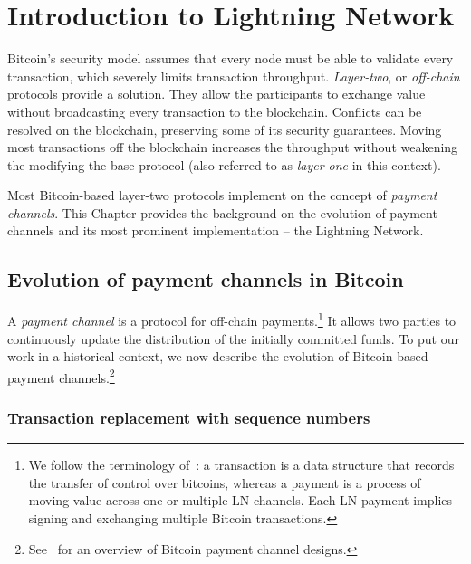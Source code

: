 \chapter{Introduction to Lightning Network}

\label{Chapter05IntroLightning}

Bitcoin's security model assumes that every node must be able to validate every transaction, which severely limits transaction throughput.
\textit{Layer-two}, or \textit{off-chain} protocols provide a solution.
They allow the participants to exchange value without broadcasting every transaction to the blockchain.
Conflicts can be resolved on the blockchain, preserving some of its security guarantees.
Moving most transactions off the blockchain increases the throughput without weakening the modifying the base protocol (also referred to as \textit{layer-one} in this context).

Most Bitcoin-based layer-two protocols implement on the concept of \textit{payment channels}.
This Chapter provides the background on the evolution of payment channels and its most prominent implementation -- the Lightning Network.


\section{Evolution of payment channels in Bitcoin}

A \textit{payment channel} is a protocol for off-chain payments.\footnote{We follow the terminology of~\cite{Antonopoulos2020}: a transaction is a data structure that records the transfer of control over bitcoins, whereas a payment is a process of moving value across one or multiple LN channels. Each LN payment implies signing and exchanging multiple Bitcoin transactions.}
It allows two parties to continuously update the distribution of the initially committed funds.
To put our work in a historical context, we now describe the evolution of Bitcoin-based payment channels.\footnote{See~\cite{McCorry2016} for an overview of Bitcoin payment channel designs.}

\subsection{Transaction replacement with sequence numbers}

